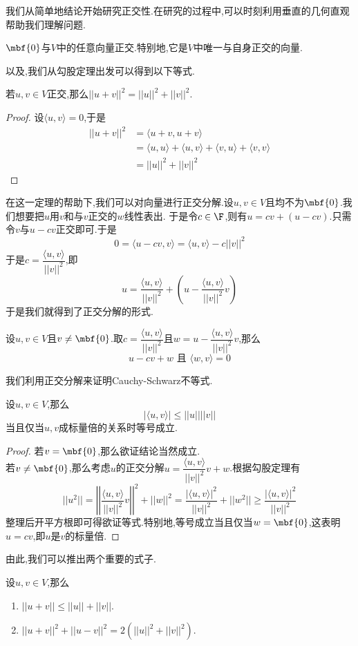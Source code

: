 \documentclass{ctexart}
\begin{document}
我们从简单地结论开始研究正交性.在研究的过程中,可以时刻利用垂直的几何直观帮助我们理解问题.
\begin{formal}
    $\mbf{0}$与$V$中的任意向量正交.特别地,它是$V$中唯一与自身正交的向量.
\end{formal}\noindent
以及,我们从勾股定理出发可以得到以下等式.
\begin{formal}
    若$u,v\in V$正交,那么$||u+v||^2=||u||^2+||v||^2$.
\end{formal}
\begin{proof}
    设$\langle u,v\rangle=0$,于是
    $$\begin{aligned}
        ||u+v||^2
        &= \langle u+v,u+v\rangle \\
        &= \langle u,u\rangle+\langle u,v\rangle+\langle v,u\rangle+\langle v,v\rangle \\
        &= ||u||^2+||v||^2
    \end{aligned}$$
\end{proof}\noindent
在这一定理的帮助下,我们可以对向量进行正交分解.设$u,v\in V$且均不为$\mbf{0}$.我们想要把$u$用$v$和与$v$正交的$w$线性表出.%
于是令$c\in\F$,则有$u=cv+(u-cv)$.只需令$v$与$u-cv$正交即可.于是
$$0=\langle u-cv,v\rangle=\langle u,v\rangle-c||v||^2$$
于是$c=\dfrac{\langle u,v\rangle}{||v||^2}$,即
$$u=\dfrac{\langle u,v\rangle}{||v||^2}+\left(u-\dfrac{\langle u,v\rangle}{||v||^2}v\right)$$
于是我们就得到了正交分解的形式.
\begin{formal}[2.6 正交分解]
    设$u,v\in V$且$v\neq\mbf{0}$.取$c=\dfrac{\langle u,v\rangle}{||v||^2}$且$w=u-\dfrac{\langle u,v\rangle}{||v||^2}v$,那么
    $$u-cv+w\text{  且  }\langle w,v\rangle=0$$
\end{formal}\noindent
我们利用正交分解来证明Cauchy-Schwarz不等式.
\begin{formal}
    设$u,v\in V$,那么$$|\langle u,v\rangle|\leqslant||u||||v||$$
    当且仅当$u,v$成标量倍的关系时等号成立.
\end{formal}
\begin{proof}
    若$v=\mbf{0}$,那么欲证结论当然成立.\\
    若$v\neq\mbf{0}$,那么考虑$u$的正交分解$u=\dfrac{\langle u,v\rangle}{||v||^2}v+w$.根据勾股定理有
    $$||u^2||=\left|\left|\dfrac{\langle u,v\rangle}{||v||^2}v\right|\right|^2+||w||^2=\dfrac{|\langle u,v\rangle|^2}{||v||^2}+||w^2||\geqslant\dfrac{|\langle u,v\rangle|^2}{||v||^2}$$
    整理后开平方根即可得欲证等式.特别地,等号成立当且仅当$w=\mbf{0}$,这表明$u=cv$,即$u$是$v$的标量倍.
\end{proof}\noindent
由此,我们可以推出两个重要的式子.
\begin{formal}[2.8 三角不等式与平行四边形等式]
    设$u,v\in V$,那么
    \begin{enumerate}[label=\tbf{(\arabic*)}]
        \item $||u+v||\leqslant ||u||+||v||$.
        \item $||u+v||^2+||u-v||^2=2\left(||u||^2+||v||^2\right)$.
    \end{enumerate}
\end{formal}
\end{document}
